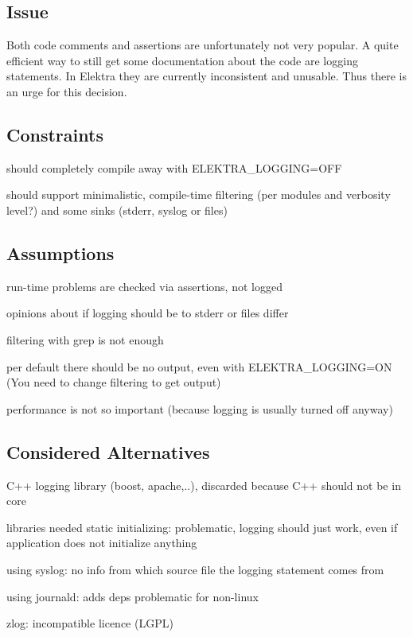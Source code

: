 \subsection*{Issue}

Both code comments and assertions are unfortunately not very popular. A quite efficient way to still get some documentation about the code are logging statements. In Elektra they are currently inconsistent and unusable. Thus there is an urge for this decision.

\subsection*{Constraints}


\begin{DoxyItemize}
\item should completely compile away with E\+L\+E\+K\+T\+R\+A\+\_\+\+L\+O\+G\+G\+I\+NG=O\+FF
\item should support minimalistic, compile-\/time filtering (per modules and verbosity level?) and some sinks (stderr, syslog or files)
\end{DoxyItemize}

\subsection*{Assumptions}


\begin{DoxyItemize}
\item run-\/time problems are checked via assertions, not logged
\item opinions about if logging should be to stderr or files differ
\item filtering with grep is not enough
\item per default there should be no output, even with E\+L\+E\+K\+T\+R\+A\+\_\+\+L\+O\+G\+G\+I\+NG=ON (You need to change filtering to get output)
\item performance is not so important (because logging is usually turned off anyway)
\end{DoxyItemize}

\subsection*{Considered Alternatives}


\begin{DoxyItemize}
\item C++ logging library (boost, apache,..), discarded because C++ should not be in core
\item libraries needed static initializing\+: problematic, logging should just work, even if application does not initialize anything
\item using syslog\+: no info from which source file the logging statement comes from
\item using journald\+: adds deps problematic for non-\/linux
\item zlog\+: incompatible licence (L\+G\+PL)
\end{DoxyItemize}

